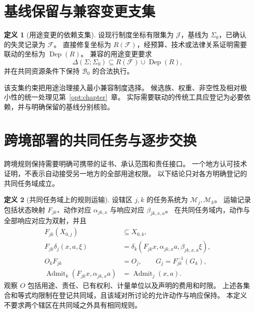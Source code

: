 \documentclass[UTF8,12pt,a4paper,openany,fontset=none,zihao=false]{ctexrep}
\theoremstyle{definition}
\newtheorem{definition}{定义}[chapter]
\newcommand{\1}{\mathbf 1}
\begin{document}
\section{基线保留与兼容变更支集}

\begin{definition}[用途变更的依赖支集]
\label{gov:support}
设现行制度坐标有限集为 \(\mathcal J\)，基线为 \(\Sigma_0\)，已确认的失灵记录为 \(\mathcal F\)。
直接修复坐标为 \(R(\mathcal F)\)，经预算、技术或法律关系证明需要联动的坐标为 \(\operatorname{Dep}(R)\)。
兼容的用途变更要求
\[
\Delta(\Sigma;\Sigma_0)\subseteq R(\mathcal F)\cup\operatorname{Dep}(R),
\]
并在共同资源条件下保持 \(\mathcal B_0\) 的合法执行。
\end{definition}

该支集约束把用途治理接入最小兼容制度选择\cite{InternalEconomics}。
候选族、权重、非空性及相对极小性的统一处理见第~\ref{opt:chapter}~章。
实际需要联动的传统工具应登记为必要依赖，并与明确保留的基线分别核验。

\section{跨境部署的共同任务与逐步交换}

跨境规则保持需要明确可携带的证书、承认范围和责任接口。
一个地方认可技术证明，不表示自动接受另一地方的全部用途权限。
以下结论只对各方明确登记的共同任务域成立。

\begin{definition}[共同任务域上的规则运输]
\label{gov:transport}
设辖区 \(j,k\) 的任务系统为 \(\mathcal M_j,\mathcal M_k\)。
运输记录包括状态映射 \(F_{jk}\)、动作对应 \(\alpha_{jk,x}\) 与响应对应 \(\beta_{jk,x,a}\)。
在共同任务域内，动作与全部响应对应为双射，并且
\[
\begin{aligned}
F_{jk}(X_{0,j})&\subseteq X_{0,k},\\
F_{jk}\delta_j(x,a,\xi)
&=\delta_k(F_{jk}x,\alpha_{jk,x}a,\beta_{jk,x,a}\xi),\\
O_kF_{jk}&=O_j,\qquad G_j=F_{jk}^{-1}(G_k),\\
\operatorname{Admit}_k(F_{jk}x,\alpha_{jk,x}a)
&=\operatorname{Admit}_j(x,a).
\end{aligned}
\]
观察 \(O\) 包括用途、责任、已有权利、计量单位以及声明的费用和时限。
上述各集合和等式均限制在登记共同域，且该域对所讨论的允许动作与响应保持。
本定义不要求两个辖区在共同域之外具有相同规则。
\end{definition}
\end{document}
